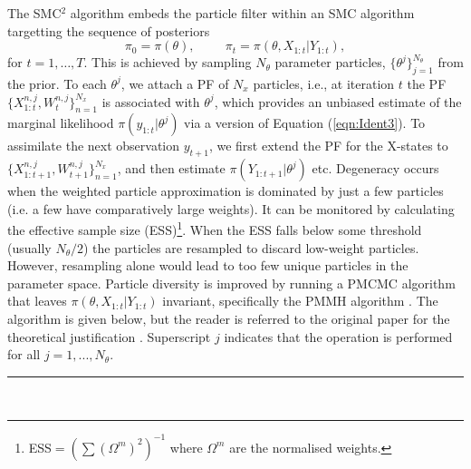 \documentclass[a4paper,12pt]{article}
\begin{document}
The SMC$^2$ algorithm \cite{Chopin2012} embeds the particle filter within an SMC algorithm targetting the sequence of posteriors
\begin{equation*}
\pi_0 = \pi(\theta), \hspace{1cm} \pi_t = \pi(\theta, X_{1:t} \vert Y_{1:t}),
\end{equation*}
for $t=1, \ldots, T$. 
This is achieved by sampling $N_\theta$ parameter particles, $\{\theta^j\}_{j=1}^{N_\theta}$ from the prior. To each $\theta^j$, we attach a PF of  $N_x$ particles, i.e., at iteration $t$ the PF $\{X_{1:t}^{n,j}, W_t^{n,j}\}_{n=1}^{N_x}$ is associated with $\theta^j$, which provides an unbiased estimate of the marginal likelihood $\pi(y_{1:t} |\theta^j)$ via a version of Equation (\ref{eqn:Ident3}). To assimilate the next observation $y_{t+1}$, we first extend the PF for the X-states to $\{X_{1:t+1}^{n,j}, W_{t+1}^{n,j}\}_{n=1}^{N_x}$, and then estimate $\pi(Y_{1:t+1} | \theta^j)$ etc. 
Degeneracy occurs when the weighted particle approximation is dominated by just  a few particles (i.e. a few have comparatively large weights).
It can be monitored by calculating the effective sample size (ESS)\footnote{ESS$ = \left( \sum  \left( \Omega^m \right)^2 \right)^{-1}$ where $\Omega^m$ are the normalised weights.}.
When the ESS falls below some threshold (usually $N_\theta / 2$) the particles are resampled to discard low-weight particles.
However, resampling alone would lead to too few unique particles in the parameter space.
Particle diversity is improved by running a PMCMC algorithm that leaves $\pi (\theta, X_{1:t} \vert Y_{1:t})$ invariant, specifically the PMMH algorithm \cite{Andrieu2010}.
The algorithm is given below, but the reader is referred to the original paper for the theoretical justification \cite{Chopin2012}.
Superscript $j$ indicates that the operation is performed for all $j = 1,...,N_{\theta}$.

\noindent \rule{\textwidth}{1pt}\\
\end{document}
